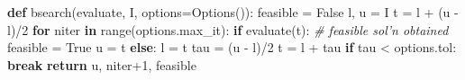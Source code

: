 \documentclass[
  ignorenonframetext,
  aspectratio=169,
  serif,onlymath]{beamer}
\newenvironment{Shaded}{}{}
\newcommand{\BuiltInTok}[1]{#1}
\newcommand{\CommentTok}[1]{\textcolor[rgb]{0.38,0.63,0.69}{\textit{#1}}}
\newcommand{\ControlFlowTok}[1]{\textcolor[rgb]{0.00,0.44,0.13}{\textbf{#1}}}
\newcommand{\DecValTok}[1]{\textcolor[rgb]{0.25,0.63,0.44}{#1}}
\newcommand{\KeywordTok}[1]{\textcolor[rgb]{0.00,0.44,0.13}{\textbf{#1}}}
\newcommand{\NormalTok}[1]{#1}
\newcommand{\OperatorTok}[1]{\textcolor[rgb]{0.40,0.40,0.40}{#1}}
\newcommand{\VariableTok}[1]{\textcolor[rgb]{0.10,0.09,0.49}{#1}}
\begin{document}
\begin{frame}[fragile]

\scriptsize

\begin{Shaded}
\begin{Highlighting}[]
\KeywordTok{def}\NormalTok{ bsearch(evaluate, I, options}\OperatorTok{=}\NormalTok{Options()):}
\NormalTok{    feasible }\OperatorTok{=} \VariableTok{False}
\NormalTok{    l, u }\OperatorTok{=}\NormalTok{ I}
\NormalTok{    t }\OperatorTok{=}\NormalTok{ l }\OperatorTok{+}\NormalTok{ (u }\OperatorTok{-}\NormalTok{ l)}\OperatorTok{/}\DecValTok{2}
    \ControlFlowTok{for}\NormalTok{ niter }\KeywordTok{in} \BuiltInTok{range}\NormalTok{(options.max_it):}
        \ControlFlowTok{if}\NormalTok{ evaluate(t):  }\CommentTok{# feasible sol'n obtained}
\NormalTok{            feasible }\OperatorTok{=} \VariableTok{True}
\NormalTok{            u }\OperatorTok{=}\NormalTok{ t}
        \ControlFlowTok{else}\NormalTok{:}
\NormalTok{            l }\OperatorTok{=}\NormalTok{ t}
\NormalTok{        tau }\OperatorTok{=}\NormalTok{ (u }\OperatorTok{-}\NormalTok{ l)}\OperatorTok{/}\DecValTok{2}
\NormalTok{        t }\OperatorTok{=}\NormalTok{ l }\OperatorTok{+}\NormalTok{ tau}
        \ControlFlowTok{if}\NormalTok{ tau }\OperatorTok{<}\NormalTok{ options.tol:}
            \ControlFlowTok{break}
    \ControlFlowTok{return}\NormalTok{ u, niter}\OperatorTok{+}\DecValTok{1}\NormalTok{, feasible}
\end{Highlighting}
\end{Shaded}

\end{frame}
\end{document}

